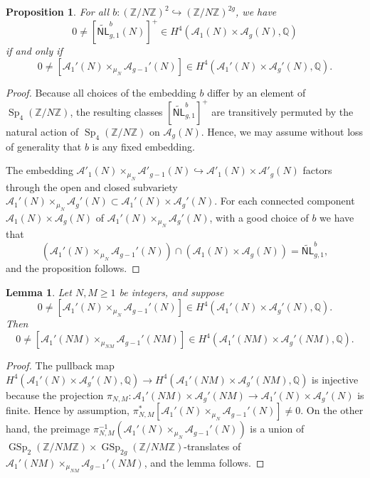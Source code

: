 \documentclass[12pt]{amsart}
\DeclareMathOperator{\Sp}{Sp}
\newtheorem{lem}[thm]{Lemma}
\newtheorem{prop}[thm]{Proposition}
\theoremstyle{definition}
\newcommand{\Z}{\mathbb{Z}}
\newcommand{\Q}{\mathbb{Q}}
\DeclareMathOperator{\GSp}{GSp}
\begin{document}
\begin{prop}\label{appendix prop:rewrite NL class}
    For all $b: (\Z/N\Z)^2 \hookrightarrow (\Z/N\Z)^{2g}$, we have 
    $$0 \neq [\widetilde{\mathsf{NL}}_{g,1}^b(N)]^+ \in H^4(\mathcal A_1(N)\times \mathcal A_g(N), \Q)$$ if and only if $$0 \neq [\mathcal A_{1}'(N) \times_{\mu_N} \mathcal A_{g-1}'(N)] \in H^4(\mathcal A_1'(N)\times \mathcal A_g'(N), \Q).$$
\end{prop}
\begin{proof}
    Because all choices of the embedding $b$ differ by an element of $\Sp_4(\Z/N\Z)$, the resulting classes $[\widetilde{\mathsf{NL}}_{g,1}^b]^+$ are transitively permuted by the natural action of $\Sp_4(\Z/N\Z)$ on $\mathcal A_g(N)$. Hence, we may assume without loss of generality that $b$ is any fixed embedding. 
    
    The embedding $\mathcal A'_{1}(N)\times_{\mu_N} \mathcal A'_{g-1}(N)\hookrightarrow\mathcal A'_1(N)\times \mathcal A'_g(N)$ factors through the open and closed subvariety $\mathcal A_1'(N)\times _{\mu_N}\mathcal A_g'(N)\subset \mathcal A_1'(N)\times \mathcal A_g'(N)$. For each connected component $\mathcal A_1(N) \times \mathcal A_g(N)$ of $\mathcal A_1'(N)\times _{\mu_N}\mathcal A_g'(N)$, with a good choice of $b$ we have that $$(\mathcal A_{1}'(N) \times_{\mu_N} \mathcal A_{g-1}'(N))\cap (\mathcal A_1(N) \times \mathcal A_g(N)) = \widetilde{\mathsf{NL}}_{g,1}^b,$$ and the proposition follows. 
    
\end{proof}
\begin{lem}\label{appendix lemma:divisible ok}
    Let $N, M\geq 1$ be integers, and suppose $$0 \neq  \left[\mathcal A_1'(N)\times_{\mu_N} \mathcal A_{g-1}'(N)\right] \in H^4(\mathcal A_1'(N) \times \mathcal A_g'(N),\Q).$$ Then $$0 \neq  \left[\mathcal A_1'(NM)\times_{\mu_{NM}} \mathcal A_{g-1}'(NM)\right] \in H^4(\mathcal A_1'(NM) \times \mathcal A_g'(NM),\Q).$$
\end{lem}
\begin{proof}
    The pullback map $H^4(\mathcal A_1'(N) \times \mathcal A_g'(N),\Q)\to H^4(\mathcal A_1'(NM) \times \mathcal A_g'(NM),\Q)$ is injective because the projection $\pi_{N,M}:\mathcal A_1'(NM) \times \mathcal A_g'(NM)\to \mathcal A_1'(N) \times \mathcal A_g'(N)$ is finite. Hence by assumption, $\pi_{N,M}^\ast\left[\mathcal A_1'(N)\times_{\mu_N} \mathcal A_{g-1}'(N)\right] \neq 0$. On the other hand, the preimage $\pi_{N,M}^{-1} (\mathcal A_1'(N)\times_{\mu_N} \mathcal A_{g-1}'(N))$ is a union of $\GSp_2(\Z/NM\Z) \times \GSp_{2g}(\Z/NM\Z)$-translates of $\mathcal A_1'(NM)\times_{\mu_{NM}} \mathcal A_{g-1}'(NM)$, and the lemma follows. 
\end{proof}
\end{document}
